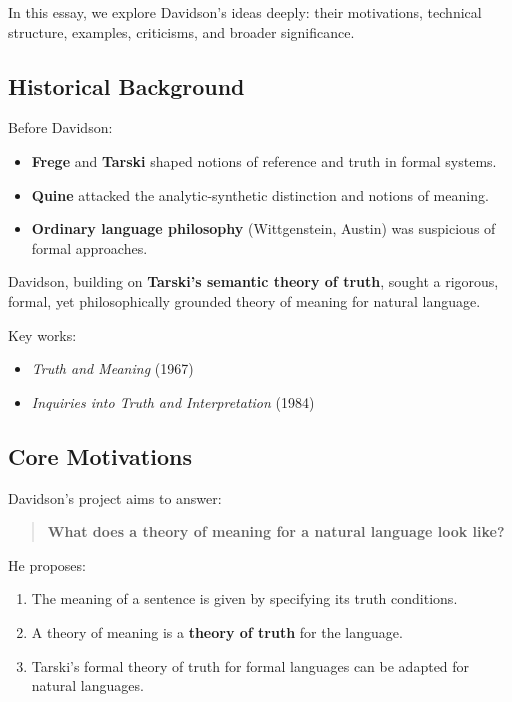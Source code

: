 \documentclass[12pt]{article}
\newcommand{\tightlist}{\itemsep 0pt\parskip 0pt\parsep 0pt}
\begin{document}
In this essay, we explore Davidson's ideas deeply: their motivations,
technical structure, examples, criticisms, and broader significance.

\hypertarget{historical-background-1}{%
\subsection{Historical Background}\label{historical-background-1}}

Before Davidson:

\begin{itemize}
\tightlist
\item
  \textbf{Frege} and \textbf{Tarski} shaped notions of reference and
  truth in formal systems.
\item
  \textbf{Quine} attacked the analytic-synthetic distinction and notions
  of meaning.
\item
  \textbf{Ordinary language philosophy} (Wittgenstein, Austin) was
  suspicious of formal approaches.
\end{itemize}

Davidson, building on \textbf{Tarski's semantic theory of truth}, sought
a rigorous, formal, yet philosophically grounded theory of meaning for
natural language.

Key works:

\begin{itemize}
\tightlist
\item
  \emph{Truth and Meaning} (1967)
\item
  \emph{Inquiries into Truth and Interpretation} (1984)
\end{itemize}

\hypertarget{core-motivations-1}{%
\subsection{Core Motivations}\label{core-motivations-1}}

Davidson's project aims to answer:

\begin{quote}
\textbf{What does a theory of meaning for a natural language look like?}
\end{quote}

He proposes:

\begin{enumerate}
\def\labelenumi{\arabic{enumi}.}
\tightlist
\item
  The meaning of a sentence is given by specifying its truth conditions.
\item
  A theory of meaning is a \textbf{theory of truth} for the language.
\item
  Tarski's formal theory of truth for formal languages can be adapted
  for natural languages.
\end{enumerate}
\end{document}
